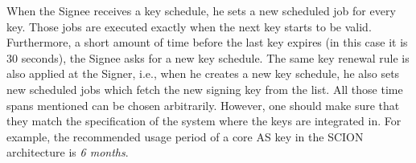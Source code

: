 When the Signee receives a key schedule, he sets a new scheduled job for every key. Those jobs are executed exactly when the next key starts to be valid. Furthermore, a short amount of time before the last key expires (in this case it is 30 seconds), the Signee asks for a new key schedule. The same key renewal rule is also applied at the Signer, i.e., when he creates a new key schedule, he also sets new scheduled jobs which fetch the new signing key from the list. All those time spans mentioned can be chosen arbitrarily. However, one should make sure that they match the specification of the system where the keys are integrated in. For example, the recommended usage period of a core AS key in the SCION architecture \cite{scion_book} is \emph{6 months}.




